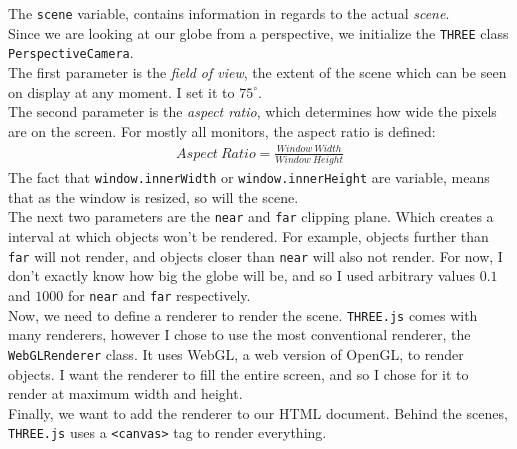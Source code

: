 The \verb|scene| variable, contains information in regards to the actual \textit{scene}. \\
Since we are looking at our globe from a perspective, we initialize the \verb|THREE| class \verb|PerspectiveCamera|. \\ The first parameter is the \textit{field of view}, the extent of the scene which can be seen on display at any moment. I set it to $75^{\circ}$. \\
The second parameter is the \textit{aspect ratio}, which determines how wide the pixels are on the screen. For mostly all monitors, the aspect ratio is defined:
\begin{align*}
Aspect\ Ratio = \frac{Window\ Width}{Window\ Height}
\end{align*}
The fact that \verb|window.innerWidth| or \verb|window.innerHeight| are variable, means that as the window is resized, so will the scene. \\
The next two parameters are the \verb|near| and \verb|far| clipping plane. Which creates a interval at which objects won't be rendered. For example, objects further than \verb|far| will not render, and objects closer than \verb|near| will also not render. For now, I don't exactly know how big the globe will be, and so I used arbitrary values $0.1$ and $1000$ for \verb|near| and \verb|far| respectively. \\

Now, we need to define a renderer to render the scene. \verb|THREE.js| comes with many renderers, however I chose to use the most conventional renderer, the \verb|WebGLRenderer| class. It uses WebGL, a web version of OpenGL, to render objects. I want the renderer to fill the entire screen, and so I chose for it to render at maximum width and height. \\
Finally, we want to add the renderer to our HTML document. Behind the scenes, \verb|THREE.js| uses a \verb|<canvas>| tag to render everything.

\newpage
